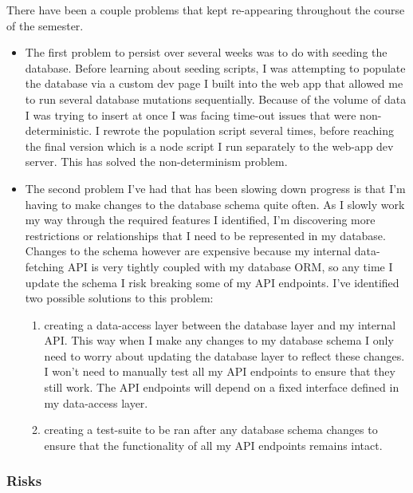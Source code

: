 \documentclass[11pt]{article}
\begin{document}
There have been a couple problems that kept re-appearing throughout the course of the semester. 
\begin{itemize}
    \item The first problem to persist over several weeks was to do with seeding the database. Before learning about seeding scripts, I was attempting to populate the database via a custom dev page I built into the web app that allowed me to run several database mutations sequentially. Because of the volume of data I was trying to insert at once I was facing time-out issues that were non-deterministic. I rewrote the population script several times, before reaching the final version which is a node script I run separately to the web-app dev server. This has solved the non-determinism problem. 
    \item The second problem I've had that has been slowing down progress is that I'm having to make changes to the database schema quite often. As I slowly work my way through the required features I identified, I'm discovering more restrictions or relationships that I need to be represented in my database. Changes to the schema however are expensive because my internal data-fetching API is very tightly coupled with my database ORM, so any time I update the schema I risk breaking some of my API endpoints. I've identified two possible solutions to this problem: 
    \begin{enumerate}
        \item creating a data-access layer between the database layer and my internal API. This way when I make any changes to my database schema I only need to worry about updating the database layer to reflect these changes. I won't need to manually test all my API endpoints to ensure that they still work. The API endpoints will depend on a fixed interface defined in my data-access layer.
        \item creating a test-suite to be ran after any database schema changes to ensure that the functionality of all my API endpoints remains intact.
    \end{enumerate}
\end{itemize}



\subsubsection{Risks}\label{risks}
\end{document}
